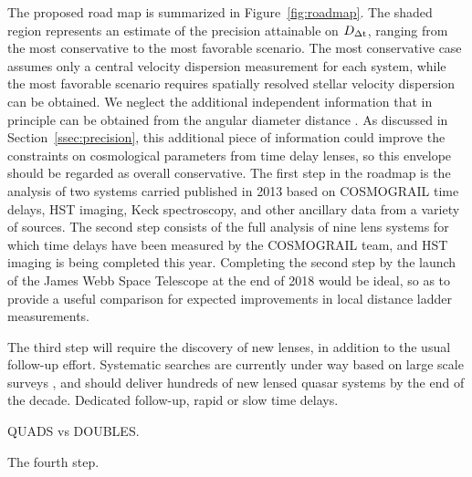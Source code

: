 The proposed road map is summarized in Figure~\ref{fig:roadmap}. The
shaded region represents an estimate of the precision attainable on
$D_{\Delta{\rm t}}$, ranging from the most conservative to the most favorable
scenario. The most conservative case assumes only a central velocity
dispersion measurement for each system, while the most favorable
scenario requires spatially resolved stellar velocity dispersion can
be obtained. We neglect the additional independent information that in
principle can be obtained from the angular diameter distance
\citep{JeeKomatsuSuyu2015,JeeEtal2016}.  As discussed in 
Section~\ref{ssec:precision}, this additional piece of information
could improve the constraints on cosmological parameters from time
delay lenses, so this envelope should be regarded as overall
conservative. The first step in the roadmap is the analysis of two
systems carried published in 2013 based on COSMOGRAIL time delays, HST
imaging, Keck spectroscopy, and other ancillary data from a variety of
sources. The second step consists of the full analysis of nine lens
systems for which time delays have been measured by the COSMOGRAIL
team, and HST imaging is being completed this year. Completing the
second step by the launch of the James Webb Space Telescope at the end
of 2018 would be ideal, so as to provide a useful comparison for
expected improvements in local distance ladder measurements. 

The third step will require the discovery of new lenses, in addition
to the usual follow-up effort. Systematic searches are currently under
way based on large scale surveys \citep{Agn++15,Mor++16}, and should
deliver hundreds of new lensed quasar systems
\citep{O+M10} by the end of the decade. 
Dedicated follow-up, rapid or slow time delays.

QUADS vs DOUBLES.

The fourth step.  

